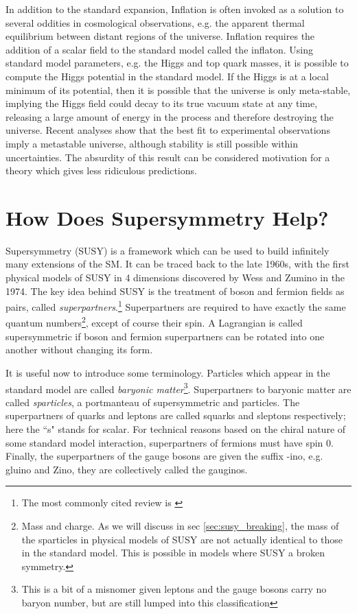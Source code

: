 \begin{enumerate}
       In addition to the standard expansion, Inflation is often invoked as a solution to several oddities in cosmological observations, e.g. the apparent thermal equilibrium between distant regions of the universe. Inflation requires the addition of a scalar field to the standard model called the inflaton.
       Using standard model parameters, e.g. the Higgs and top quark masses, it is possible to compute the Higgs potential in the standard model. If the Higgs is at a local minimum of its potential, then it is possible that the universe is only meta-stable, implying the Higgs field could decay to its true vacuum state at any time, releasing a large amount of energy in the process and therefore destroying the universe. Recent analyses show that the best fit to experimental observations imply a metastable universe, although stability is still possible within uncertainties. \cite{Unstable_universe} The absurdity of this result can be considered motivation for a theory which gives less ridiculous predictions.
    \end{enumerate}                 
  
\section{How Does Supersymmetry Help?}
  Supersymmetry (SUSY) is a framework which can be used to build infinitely many extensions of the SM. It can be traced back to the late 1960s, with the first physical models of SUSY in 4 dimensions discovered by Wess and Zumino in the 1974. \cite[ch. 24]{weinberg_SUSY} The key idea behind SUSY is the treatment of boson and fermion fields as pairs, called \emph{superpartners}.\footnote{The most commonly cited review is \cite{SUSY_Primer}} Superpartners are required to have exactly the same quantum numbers\footnote{Mass and charge. As we will discuss in sec \ref{sec:susy_breaking}, the mass of the sparticles in physical models of SUSY are not actually identical to those in the standard model. This is possible in models where SUSY a broken symmetry.}, except of course their spin. A Lagrangian is called supersymmetric if boson and fermion superpartners can be rotated into one another without changing its form.

  It is useful now to introduce some terminology. Particles which appear in the standard model are called \emph{baryonic matter}\footnote{This is a bit of a misnomer given leptons and the gauge bosons carry no baryon number, but are still lumped into this classification}. Superpartners to baryonic matter are called \emph{sparticles}, a portmanteau of supersymmetric and particles. The superpartners of quarks and leptons are called squarks and sleptons respectively; here the ``s" stands for scalar. For technical reasons based on the chiral nature of some standard model interaction, superpartners of fermions must have spin 0. Finally, the superpartners of the gauge bosons are given the suffix -ino, e.g. gluino and Zino, they are collectively called the gauginos. 

